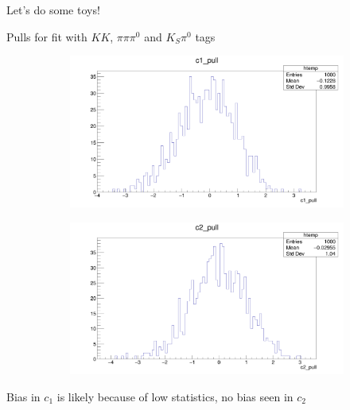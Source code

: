 \documentclass{beamer}
\begin{document}
\begin{frame}{Let's do some toys!}
  \begin{center}
    Pulls for fit with $KK$, $\pi\pi\pi^0$ and $K_S\pi^0$ tags
  \end{center}
  \begin{figure}
    \centering
    \begin{subfigure}{0.49\textwidth}
      \includegraphics[width = 1.0\textwidth]{Plots/c1_pull.png}
    \end{subfigure}%
    \begin{subfigure}{0.49\textwidth}
      \includegraphics[width = 1.0\textwidth]{Plots/c2_pull.png}
    \end{subfigure}
  \end{figure}
  \begin{center}
    Bias in $c_1$ is likely because of low statistics, no bias seen in $c_2$
  \end{center}
\end{frame}
\end{document}
